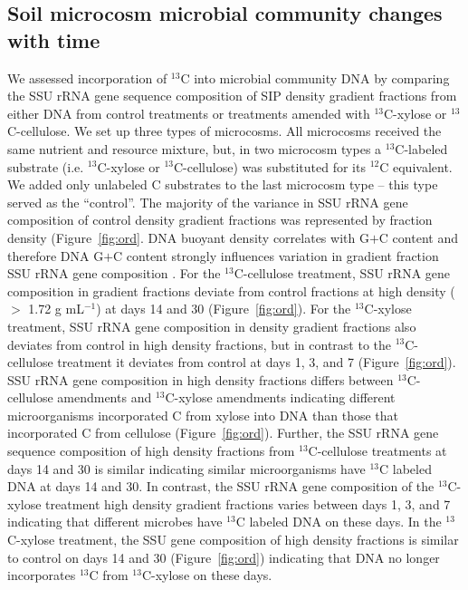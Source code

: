 \subsection{Soil microcosm microbial community changes with time}
We assessed incorporation of $^{13}$C into microbial community DNA by comparing the
SSU rRNA gene sequence composition of SIP density gradient fractions from
either DNA from control treatments or treatments amended with $^{13}$C-xylose
or $^{13}$C-cellulose. We set up three types of microcosms. All microcosms
received the same nutrient and resource mixture, but, in two microcosm types
a $^{13}$C-labeled substrate (i.e. $^{13}$C-xylose or $^{13}$C-cellulose) was
substituted for its $^{12}$C equivalent. We added only unlabeled C substrates
to the last microcosm type -- this type served as the ``control''. The majority
of the variance in SSU rRNA gene composition of control density gradient
fractions was represented by fraction density (Figure~\ref{fig:ord}. DNA
buoyant density correlates with G$+$C content \citep{Buckley_2007} and
therefore DNA G$+$C content strongly influences variation in gradient
fraction SSU rRNA gene composition . For the $^{13}$C-cellulose treatment, SSU
rRNA gene composition in gradient fractions deviate from control fractions at
high density ($>$ 1.72 g mL$^{-1}$) at days 14 and 30 (Figure~\ref{fig:ord}).
For the $^{13}$C-xylose treatment, SSU rRNA gene composition in density
gradient fractions also deviates from control in high density fractions, but in
contrast to the $^{13}$C-cellulose treatment it deviates from control at days
1, 3, and 7 (Figure~\ref{fig:ord}). SSU rRNA gene composition in high density
fractions differs between $^{13}$C-cellulose amendments and $^{13}$C-xylose
amendments indicating different microorganisms incorporated C from xylose into
DNA than those that incorporated C from cellulose (Figure~\ref{fig:ord}).
Further, the SSU rRNA gene sequence composition of high density fractions from
$^{13}$C-cellulose treatments at days 14 and 30 is similar indicating similar
microorganisms have $^{13}$C labeled DNA at days 14 and 30. In contrast, the
SSU rRNA gene composition of the $^{13}$C-xylose treatment high density
gradient fractions varies between days 1, 3, and 7 indicating that different
microbes have $^{13}$C labeled DNA on these days. In the $^{13}$C-xylose
treatment, the SSU gene composition of high density fractions is similar to
control on days 14 and 30 (Figure~\ref{fig:ord}) indicating that DNA no longer
incorporates $^{13}$C from $^{13}$C-xylose on these days. 

